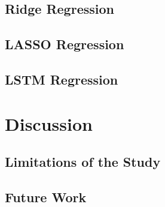 \documentclass[a4paper, 11pt]{article}
\begin{document}
\subsection{Ridge Regression}

\subsection{LASSO Regression}

\subsection{LSTM Regression}

\section{Discussion}

\subsection{Limitations of the Study}

\subsection{Future Work}
\end{document}
